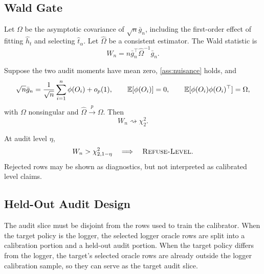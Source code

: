 \subsection{Wald Gate}

Let $\Omega$ be the asymptotic covariance of $\sqrt n\bar g_n$, including the
first-order effect of fitting $\hat h_t$ and selecting $\hat t_\alpha$. Let
$\hat\Omega$ be a consistent estimator. The Wald statistic is
\begin{equation}
W_n=n\bar g_n^\top\hat\Omega^{-1}\bar g_n.
\label{eq:formal-wald}
\end{equation}

\begin{theorem}
\label{thm:formal-wald-limit}
Suppose the two audit moments have mean zero, \cref{ass:nuisance} holds, and
\[
\sqrt n\bar g_n
=\frac{1}{\sqrt n}\sum_{i=1}^n\phi(O_i)+o_p(1),
\qquad
\mathbb{E}[\phi(O_i)]=0,\qquad
\mathbb{E}[\phi(O_i)\phi(O_i)^\top]=\Omega,
\]
with $\Omega$ nonsingular and $\hat\Omega\overset{p}{\to}\Omega$. Then
\[
W_n\rightsquigarrow\chi^2_2.
\]
\end{theorem}

\begin{twocolproof}
\end{twocolproof}

At audit level $\eta$,
\[
W_n>\chi^2_{2,1-\eta}
\quad\Longrightarrow\quad
\textsc{Refuse-Level}.
\]
Rejected rows may be shown as diagnostics, but not interpreted as calibrated
level claims.

\subsection{Held-Out Audit Design}
\label{app:audit-holdout}

The audit slice must be disjoint from the rows used to train the calibrator.
When the target policy is the logger, the selected logger oracle rows are split
into a calibration portion and a held-out audit portion. When the target policy
differs from the logger, the target's selected oracle rows are already outside
the logger calibration sample, so they can serve as the target audit slice.


